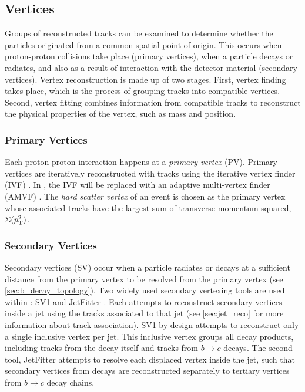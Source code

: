 \subsection{Vertices}\label{sec:vertex_reco}
Groups of reconstructed tracks can be examined to determine whether the particles originated from a common spatial point of origin.
This occurs when proton-proton collisions take place (primary vertices), when a particle decays or radiates, and also as a result of interaction with the detector material (secondary vertices).
Vertex reconstruction is made up of two stages.
First, vertex finding takes place, which is the process of grouping tracks into compatible vertices.
Second, vertex fitting combines information from compatible tracks to reconstruct the physical properties of the vertex, such as mass and position.

\subsubsection{Primary Vertices}
Each proton-proton interaction happens at a \textit{primary vertex} (PV).
Primary vertices are iteratively reconstructed with tracks using the iterative vertex finder (IVF) \cite{PERF-2015-01}.
In \runthree, the IVF will be replaced with an adaptive multi-vertex finder (AMVF) \cite{ATL-PHYS-PUB-2019-015}.
The \textit{hard scatter vertex} of an event is chosen as the primary vertex whose associated tracks have the largest sum of transverse momentum squared, $\Sigma(p_{\text{T}}^2)$.

\subsubsection{Secondary Vertices}
Secondary vertices (SV) occur when a particle radiates or decays at a sufficient distance from the primary vertex to be resolved from the primary vertex (see \cref{sec:b_decay_topology}).
Two widely used secondary vertexing tools are used within \ATLAS: SV1 and JetFitter \cite{FTAG-2018-01}.
Each attempts to reconstruct secondary vertices inside a jet using the tracks associated to that jet (see \cref{sec:jet_reco} for more information about track association).
SV1 by design attempts to reconstruct only a single inclusive vertex per jet.
This inclusive vertex groups all \bhadron decay products, including tracks from the \bhadron decay itself and tracks from $b \rightarrow c$ decays.
The second tool, JetFitter attempts to resolve each displaced vertex inside the jet, such that secondary vertices from \bhadron decays are reconstructed separately to tertiary vertices from $b \rightarrow c$ decay chains.


